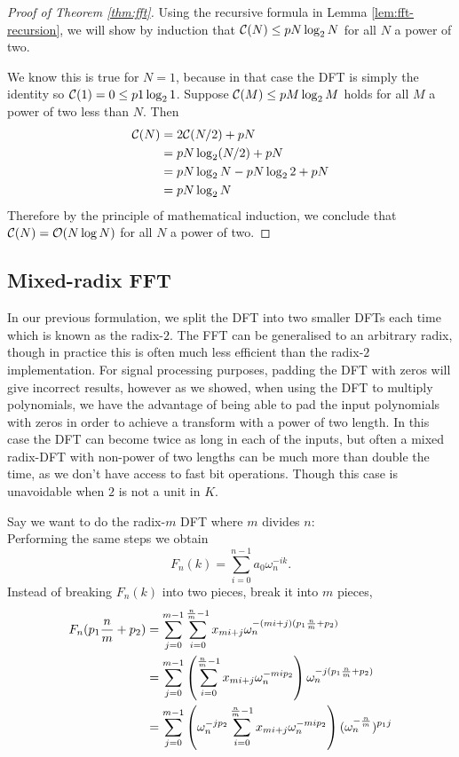 \begin{proof}[Proof of Theorem \ref{thm:fft}]
    Using the recursive formula in Lemma \ref{lem:fft-recursion}, we will show by induction that $\mathcal C(N) \le pN\log_2 N$ for all $N$ a power of two.

    We know this is true for $N = 1$, because in that case the DFT is simply the identity so $\mathcal C(1) = 0 \le p1 \log_2 1$.
    Suppose $\mathcal C(M) \le pM\log_2 M$ holds for all $M$ a power of two less than $N$. Then
    \begin{align*}
        \mathcal C(N)
        &= 2\mathcal C(N/2) + pN\\
        &= pN\log_2 (N/2) + pN\\
        &= pN\log_2 N - pN\log_2 2 + pN\\
        &= pN\log_2 N
    \end{align*}
    Therefore by the principle of mathematical induction, we conclude that $\mathcal C(N) = \mathcal O(N \log N)$ for all $N$ a power of two.
\end{proof}


\subsection{Mixed-radix FFT}

In our previous formulation, we split the DFT into two smaller DFTs each time which is known as the radix-$2$. The FFT can be generalised to an arbitrary radix, though in practice this is often much less efficient than the radix-$2$ implementation. For signal processing purposes, padding the DFT with zeros will give incorrect results, however as we showed, when using the DFT to multiply polynomials, we have the advantage of being able to pad the input polynomials with zeros in order to achieve a transform with a power of two length. In this case the DFT can become twice as long in each of the inputs, but often a mixed radix-DFT with non-power of two lengths can be much more than double the time, as we don't have access to fast bit operations. Though this case is unavoidable when $2$ is not a unit in $K$.

Say we want to do the radix-$m$ DFT where $m$ divides $n$:\\
Performing the same steps we obtain
\[
    F_n(k) = \sum^{n-1}_{i=0} a_0\omega_n^{-ik}.
\]
Instead of breaking $F_n(k)$ into two pieces, break it into $m$ pieces,
\begin{align*}
    F_n(p_1\frac{n}{m} + p_2) 
    &= \sum^{m-1}_{j=0} \sum^{\frac{n}{m}-1}_{i=0} x_{mi + j}\omega_n^{-(mi + j)(p_1 \frac{n}{m} + p_2)}\\ 
    &= \sum^{m-1}_{j=0} \left(\sum^{\frac{n}{m}-1}_{i=0} x_{mi + j}\omega_n^{-mi p_2}\right) \omega_n^{-j(p_1\frac{n}{m} + p_2)}\\
    &= \sum^{m-1}_{j=0} \left(\omega_n^{-jp_2}\sum^{\frac{n}{m}-1}_{i=0} x_{mi + j}\omega_n^{-mi p_2}\right) (\omega_n^{-\frac{n}{m}})^{p_1 j}
\end{align*}

